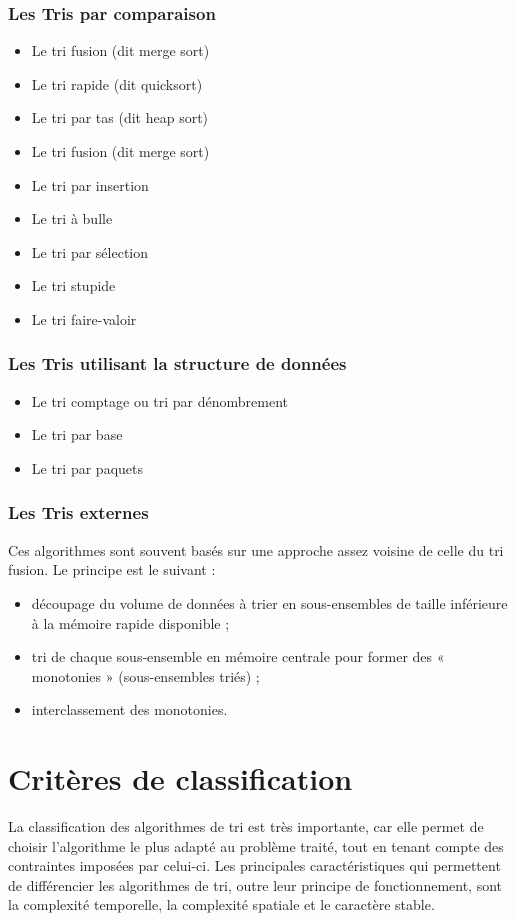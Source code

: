 \documentclass[11pt,a4paper]{article}
\begin{document}
\subsubsection{Les Tris par comparaison}
\begin{itemize}
    \item Le tri fusion (dit merge sort)
    \item Le tri rapide (dit quicksort)
    \item Le tri par tas (dit heap sort)
    \item Le tri fusion (dit merge sort)
    \item Le tri par insertion
    \item Le tri à bulle
    \item Le tri par sélection
    \item Le tri stupide
    \item Le tri faire-valoir
\end{itemize}
\newpage
\subsubsection{Les Tris utilisant la structure de données}
\begin{itemize}
    \item Le tri comptage ou tri par dénombrement
    \item Le tri par base
    \item Le tri par paquets
\end{itemize}

\subsubsection{Les Tris externes}
Ces algorithmes sont souvent basés sur une approche assez voisine de celle du tri fusion. Le principe est le suivant :
\vspace{0.2cm}

\begin{itemize}
    \item découpage du volume de données à trier en sous-ensembles de taille inférieure à la mémoire rapide disponible ;
    \item tri de chaque sous-ensemble en mémoire centrale pour former des « monotonies » (sous-ensembles triés) ;
    \item interclassement des monotonies.
\end{itemize}

\section{Critères de classification}
La classification des algorithmes de tri est très importante, car elle permet de choisir l’algorithme le plus adapté au problème traité,
tout en tenant compte des contraintes imposées par celui-ci. Les principales caractéristiques qui permettent de différencier les algorithmes
de tri, outre leur principe de fonctionnement, sont la complexité temporelle, la complexité spatiale et le caractère stable.
\end{document}
